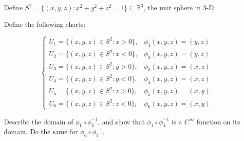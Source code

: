 \documentclass[10pt]{article}
\newenvironment{problem}[2][]{\begin{trivlist}
\item[\hskip \labelsep {\bfseries #1}\hskip \labelsep {\bfseries #2.}]}{\end{trivlist}}
\begin{document}
\begin{problem}{Question 6}

Define $S^2 = \{ (x,y,z) : x^2 + y^2 + z^2 = 1 \} \subseteq \mathbb{R}^3$, the unit sphere in 3-D.

Define the following charts:

$$\begin{cases} U_1 = \{ (x,y,z) \in S^2 : x > 0 \}, & \phi_1(x,y,z) = (y,z) \\  U_2 = \{ (x,y,z) \in S^2 : x < 0 \}, & \phi_2(x,y,z) = (y,z) \\  U_3 = \{ (x,y,z) \in S^2 : y > 0 \}, & \phi_3(x,y,z) = (x,z) \\  U_4 = \{ (x,y,z) \in S^2 : y <  0 \}, & \phi_4(x,y,z) = (x,z) \\  U_5 = \{ (x,y,z) \in S^2 : z > 0 \}, & \phi_5(x,y,z) = (x,y) \\  U_6 = \{ (x,y,z) \in S^2 : z < 0 \}, & \phi_6(x,y,z) = (x,y) \end{cases}$$

Describe the domain of $\phi_1 \circ \phi_4^{-1}$, and show that $\phi_1 \circ \phi_4^{-1}$ is a $C^\infty$ function on its domain. Do the same for $\phi_6 \circ \phi_1^{-1}$.

\end{problem}
\end{document}
